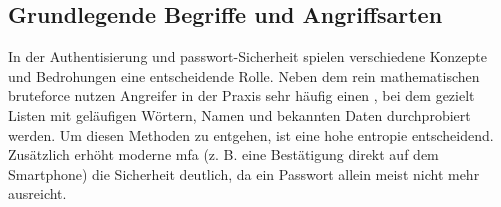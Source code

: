 \documentclass[12pt,a4paper]{article}
\begin{document}
\subsection{Grundlegende Begriffe und Angriffsarten}
In der Authentisierung und \gls{passwort}-Sicherheit spielen verschiedene Konzepte und Bedrohungen eine entscheidende Rolle. Neben dem rein mathematischen \gls{bruteforce} nutzen Angreifer in der Praxis sehr häufig einen , bei dem gezielt Listen mit geläufigen Wörtern, Namen und bekannten Daten \mbox{durchprobiert} werden. Um diesen \mbox{Methoden} zu entgehen, ist eine hohe \gls{entropie} entscheidend. \\ Zusätzlich erhöht moderne \gls{mfa} (z. B. eine Bestätigung direkt auf dem Smartphone) die Sicherheit deutlich, da ein Passwort allein meist nicht mehr ausreicht.
 
\end{document}

